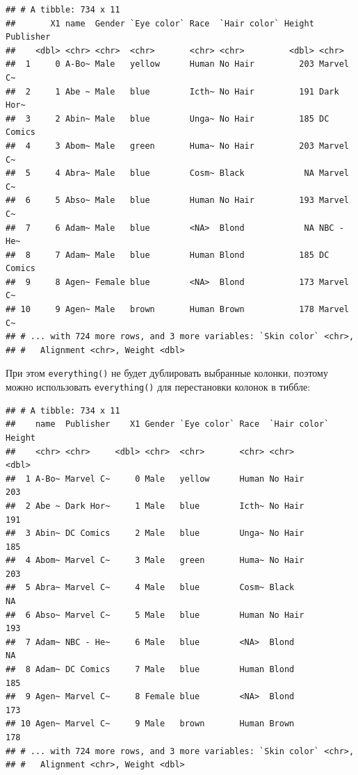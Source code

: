 \documentclass[]{book}
\newenvironment{Shaded}{\begin{snugshade}}{\end{snugshade}}
\newcommand{\KeywordTok}[1]{\textcolor[rgb]{0.13,0.29,0.53}{\textbf{#1}}}
\newcommand{\StringTok}[1]{\textcolor[rgb]{0.31,0.60,0.02}{#1}}
\newcommand{\OperatorTok}[1]{\textcolor[rgb]{0.81,0.36,0.00}{\textbf{#1}}}
\newcommand{\NormalTok}[1]{#1}
\begin{document}
\begin{verbatim}
## # A tibble: 734 x 11
##       X1 name  Gender `Eye color` Race  `Hair color` Height Publisher
##    <dbl> <chr> <chr>  <chr>       <chr> <chr>         <dbl> <chr>    
##  1     0 A-Bo~ Male   yellow      Human No Hair         203 Marvel C~
##  2     1 Abe ~ Male   blue        Icth~ No Hair         191 Dark Hor~
##  3     2 Abin~ Male   blue        Unga~ No Hair         185 DC Comics
##  4     3 Abom~ Male   green       Huma~ No Hair         203 Marvel C~
##  5     4 Abra~ Male   blue        Cosm~ Black            NA Marvel C~
##  6     5 Abso~ Male   blue        Human No Hair         193 Marvel C~
##  7     6 Adam~ Male   blue        <NA>  Blond            NA NBC - He~
##  8     7 Adam~ Male   blue        Human Blond           185 DC Comics
##  9     8 Agen~ Female blue        <NA>  Blond           173 Marvel C~
## 10     9 Agen~ Male   brown       Human Brown           178 Marvel C~
## # ... with 724 more rows, and 3 more variables: `Skin color` <chr>,
## #   Alignment <chr>, Weight <dbl>
\end{verbatim}

При этом \texttt{everything()} не будет дублировать выбранные колонки,
поэтому можно использовать \texttt{everything()} для перестановки
колонок в тиббле:

\begin{Shaded}
\end{Shaded}

\begin{verbatim}
## # A tibble: 734 x 11
##    name  Publisher    X1 Gender `Eye color` Race  `Hair color` Height
##    <chr> <chr>     <dbl> <chr>  <chr>       <chr> <chr>         <dbl>
##  1 A-Bo~ Marvel C~     0 Male   yellow      Human No Hair         203
##  2 Abe ~ Dark Hor~     1 Male   blue        Icth~ No Hair         191
##  3 Abin~ DC Comics     2 Male   blue        Unga~ No Hair         185
##  4 Abom~ Marvel C~     3 Male   green       Huma~ No Hair         203
##  5 Abra~ Marvel C~     4 Male   blue        Cosm~ Black            NA
##  6 Abso~ Marvel C~     5 Male   blue        Human No Hair         193
##  7 Adam~ NBC - He~     6 Male   blue        <NA>  Blond            NA
##  8 Adam~ DC Comics     7 Male   blue        Human Blond           185
##  9 Agen~ Marvel C~     8 Female blue        <NA>  Blond           173
## 10 Agen~ Marvel C~     9 Male   brown       Human Brown           178
## # ... with 724 more rows, and 3 more variables: `Skin color` <chr>,
## #   Alignment <chr>, Weight <dbl>
\end{verbatim}
\end{document}
